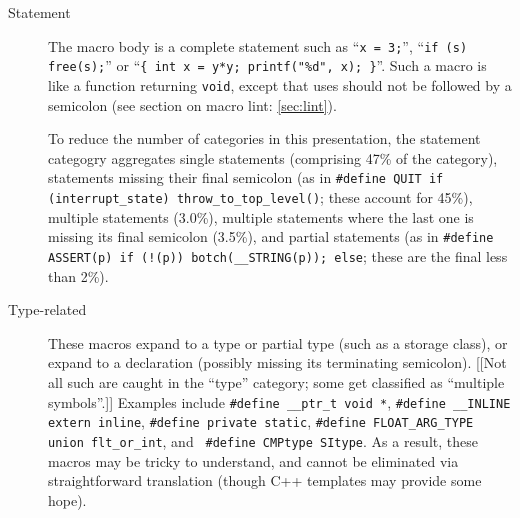 \begin{description}
\item[Statement]  The macro body is a complete statement such as
  ``{\tt x = 3;}'', ``{\tt if (s) free(s);}'' or ``{\tt \verb|{| int x =
    y*y; printf("\%d", x); \verb|}|}''.  Such a macro is like a function
    returning {\tt void}, except that uses should not be followed by a
    semicolon (see section on macro lint: \ref{sec:lint}).
    
    To reduce the number of categories in this presentation, the statement
    categogry aggregates single statements (comprising 47\% of the category),
    statements missing their final semicolon (as in {\tt \#define QUIT if
    (\verb|interrupt_state|) \verb|throw_to_top_level|()}; these account
  for 45\%), multiple statements (3.0\%), multiple statements where the
  last one is missing its final semicolon (3.5\%), and partial statements
  (as in {\tt \#define ASSERT(p) if (!(p)) botch(\verb|__STRING|(p));
  else}; these are the final less than 2\%).

\item[Type-related] 
  These macros expand to a type or partial type (such as a storage class),
  or expand to a declaration (possibly missing its terminating semicolon).
  [[Not all such are caught in the ``type'' category; some get classified
  as ``multiple symbols''.]]  Examples include {\tt \#define \verb|__ptr_t|
  void *}, {\tt \#define \verb|__INLINE| extern inline}, {\tt \#define
private static}, {\tt \#define \verb|FLOAT_ARG_TYPE| union \verb|flt_or_int|}, and {\tt
\#define CMPtype SItype}.  As a result, these macros may be tricky to
understand, and cannot be eliminated via straightforward translation
(though C++ templates may provide some hope).




\end{description}
